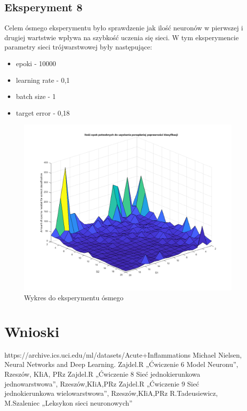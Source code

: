 \documentclass[12pt,twoside]{article}
\begin{document}
\subsection{Eksperyment 8}
Celem ósmego eksperymentu było sprawdzenie jak ilość neuronów w pierwszej i drugiej wartstwie wpływa na szybkość uczenia się sieci.
W tym eksperymencie parametry sieci trójwarstwowej były następujące:
\begin{itemize}
	\item epoki - 10000
	\item learning rate - 0,1
	\item batch size - 1
	\item target error - 0,18
\end{itemize}
\begin{figure}[ht!]
	\centering
	\includegraphics[width=15cm]{figures/S1=2+_S2=2+_epo.png}
	\caption{Wykres do eksperymentu ósmego}
\end{figure}
\newpage


\clearpage

\section{Wnioski}

\clearpage


\begin{thebibliography}{4}
 https://archive.ics.uci.edu/ml/datasets/Acute+Inflammations
 Michael Nielsen, Neural Networks and Deep Learning.
 Zajdel.R „Ćwiczenie 6 Model Neuronu”, Rzeszów, KIiA, PRz
 Zajdel.R „Ćwiczenie 8 Sieć jednokierunkowa jednowarstwowa”, Rzeszów,KIiA,PRz
 Zajdel.R „Ćwiczenie 9 Sieć jednokierunkowa wielowarstwowa”, Rzeszów,KIiA,PRz
 R.Tadeusiewicz, M.Szaleniec „Leksykon sieci neuronowych”
\end{thebibliography}

\clearpage
\end{document}
